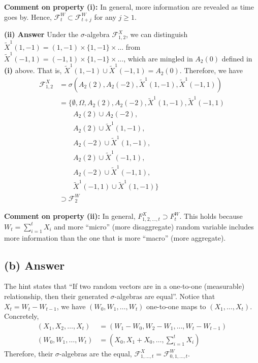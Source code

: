 \documentclass[11pt]{article}
\theoremstyle{definition}
\theoremstyle{boldtitle} %
\numberwithin{equation}{section}
\numberwithin{figure}{section}
\numberwithin{table}{section}
\begin{document}
\vspace{5mm}
\noindent \textbf{Comment on property (i):}
In general, more information are revealed as time goes by. 
Hence, $\mathcal{F}_t^W \subset \mathcal{F}_{t+j}^W$ for any $j \geq 1$.


\vspace{10mm}
\noindent \textbf{(ii) Answer} 
Under the $\sigma$-algebra $\mathcal{F}_{1,2}^X$, we can distinguish $\tilde{X}^1(1,-1) = (1, -1) \times \{1, -1\} \times ...$ from 
$\tilde{X}^1(-1,1) = (-1, 1) \times \{1, -1\} \times ...$, which are mingled in $A_2(0)$ defined in \textbf{(i)} above.
That is, $\tilde{X}^1(1,-1) \cup \tilde{X}^1(-1,1) = A_2(0)$.
Therefore, we have 
\begin{align*}
\mathcal{F}_{1,2}^X & = \sigma(A_2(2), A_2(-2), \tilde{X}^1(1,-1), \tilde{X}^1(-1,1)) \\ 
& = \{ \emptyset, \Omega,  A_2(2), A_2(-2), \tilde{X}^1(1,-1), \tilde{X}^1(-1,1)  \\ 
& \qquad A_2(2) \cup A_2(-2), \\ 
& \qquad A_2(2) \cup \tilde{X}^1(1,-1), \\
& \qquad A_2(-2) \cup \tilde{X}^1(1,-1), \\
& \qquad A_2(2) \cup \tilde{X}^1(-1,1), \\
& \qquad A_2(-2) \cup \tilde{X}^1(-1,1), \\
& \qquad\tilde{X}^1(-1,1) \cup \tilde{X}^1(1,-1)  \}\\ 
& \supset \mathcal{F}_{2}^W
\end{align*}

\vspace{5mm}
\noindent \textbf{Comment on property (ii):}
In general, $F_{1, 2, \dots, t}^X \supset F_{t}^W $.
This holds because $W_t = \sum_{i=1}^t X_i$ and more ``micro'' (more disaggregate) 
random variable includes more information than 
the one that is more ``macro'' (more aggregate).

\subsection{(b) Answer}
The hint states that 
``If two random vectors are in a one-to-one (measurable) relationship, then their generated $\sigma$-algebras are equal''.
Notice that 
$X_t = W_{t} - W_{t-1}$, we have 
$(W_0, W_1, \dots, W_t)$ one-to-one maps to $(X_1, \dots, X_t )$. 
Concretely, 
\begin{align*}
  (X_1, X_2, \dots, X_t) & = (W_1 - W_0, W_2 - W_1, \dots, W_t - W_{t-1}) \\
  (W_0, W_1, \dots, W_t) & = (X_0, X_1 + X_0, \dots, \sum_{i=1}^t X_i )
\end{align*}
Therefore, their $\sigma$-algebras are the equal, $\mathcal{F}_{1,\dots,t}^X = \mathcal{F}_{0,1,\dots,t}^W$.
\end{document}

